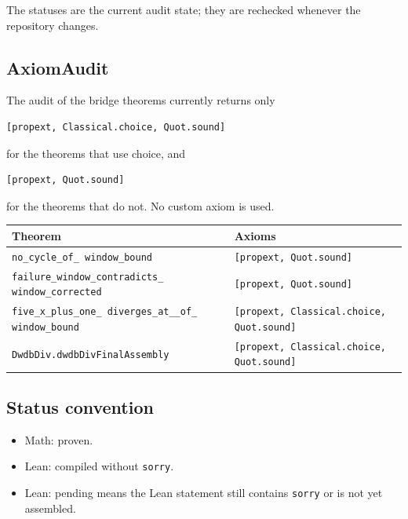 The statuses are the current audit state; they are rechecked whenever
the repository changes.

\subsection{AxiomAudit}

The audit of the bridge theorems currently returns only
\begin{verbatim}
[propext, Classical.choice, Quot.sound]
\end{verbatim}
for the theorems that use choice, and
\begin{verbatim}
[propext, Quot.sound]
\end{verbatim}
for the theorems that do not.  No custom axiom is used.

\begin{center}
\small
\begin{tabular}{@{}p{}p{}@{}}
\toprule
Theorem & Axioms \\
\midrule
\texttt{no\_\allowbreak cycle\_\allowbreak of\_\allowbreak
  window\_\allowbreak bound} &
  \texttt{[propext, Quot.sound]} \\
\texttt{failure\_\allowbreak window\_\allowbreak contradicts\_\allowbreak
  window\_\allowbreak corrected} &
  \texttt{[propext, Quot.sound]} \\
\texttt{five\_\allowbreak x\_\allowbreak plus\_\allowbreak one\_\allowbreak
  diverges\_\allowbreak at\_\allowbreak 7\_\allowbreak of\_\allowbreak
  window\_\allowbreak bound} &
  \texttt{[propext, Classical.choice, Quot.sound]} \\
\texttt{DwdbDiv.dwdbDivFinalAssembly} &
  \texttt{[propext, Classical.choice, Quot.sound]} \\
\bottomrule
\end{tabular}
\end{center}

\subsection{Status convention}

\begin{itemize}[leftmargin=*]
\item Math: proven.
\item Lean: compiled without \texttt{sorry}.
\item Lean: pending means the Lean statement still contains
  \texttt{sorry} or is not yet assembled.
\end{itemize}

